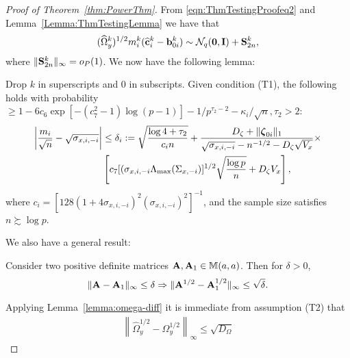 \begin{proof}[Proof of Theorem~\ref{thm:PowerThm}]
From \eqref{eqn:ThmTestingProofeq2} and Lemma~\ref{Lemma:ThmTestingLemma} we have that
%
\begin{align}
(\widehat \Omega_y^k)^{1/2} m_i^k ( \widehat {{\bf{c}}}_i^k - {\bf{b}}_{0i}^k) \sim {\cal{N}}_q ({\bf 0}, {\mathbf{I}}) + {\mathbf{S}}_{2n}^k,
\end{align}
%
where $\| {\mathbf{S}}_{2n}^k \|_\infty = o_P(1)$. We now have the following lemma:
%
\begin{Lemma}\label{Lemma:PowerThmLemma}
Drop $k$ in superscripts and 0 in subscripts. Given condition (T1), the following holds with probability $\geq 1 - 6c_{6} \exp [-(c_{7}^2-1) \log (p-1)] - 1/p^{\tau_2-2} - \kappa_i / \sqrt n, \tau_2 > 2$:
%
\begin{align}
\left| \frac{m_i}{\sqrt n} - \sqrt{ \sigma_{x,i,-i}} \right| & \leq
\delta_i := \sqrt{ \frac{ \log 4 + \tau_2}{c_i n}} +
\frac{D_\zeta + \| {\boldsymbol{\zeta}}_{0i} \|_1 }{\sqrt{ \sigma_{x,i,-i}} - n^{-1/2} - D_\zeta \sqrt{V_x}} \times \notag\\
& \left[ c_{7} [(\sigma_{x,i,-i} \Lambda_{\max} (\Sigma_{x, -i})]^{1/2} \sqrt{ \frac{\log p}{n}} + D_\zeta V_x \right], \label{eqn:PowerThmLemmaEqn}
\end{align}
%
where $c_i = [ 128 (1 + 4 \sigma_{x,i,-i})^2 (\sigma_{x,i,-i})^2 ]^{-1}$, and the sample size satisfies $n \succsim \log p$.
\end{Lemma}
%

We also have a general result:

\begin{Lemma}\label{lemma:omega-diff}
Consider two positive definite matrices ${\mathbf{A}}, {\mathbf{A}}_1 \in {\mathbb{M}}(a,a)$. Then for $\delta > 0$,
%
$$
\| {\mathbf{A}}  -{\mathbf{A}}_1 \|_\infty \leq \delta \Rightarrow \| {\mathbf{A}}^{1/2} - {\mathbf{A}}_1^{1/2} \|_\infty \leq \sqrt{ \delta}.
$$
\end{Lemma}
%

\noindent Applying Lemma~\ref{lemma:omega-diff} it is immediate from assumption (T2) that
%
\begin{align}\label{eqn:omega-sqrt-bound}
\left\| \widehat \Omega_y^{1/2} - \Omega_y^{1/2} \right\|_\infty \leq \sqrt{ D_{\Omega}}
\end{align}


\end{proof}
